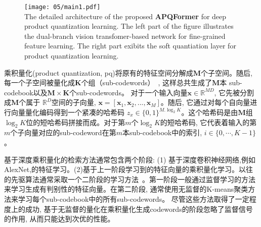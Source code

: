 \begin{figure}[!htp]
  \centering
  \texttt{[image: 05/main1.pdf]} \\
    {The detailed architecture of the proposed \textbf{APQFormer} for deep product quantization learning. The left part of the figure illustrates the dual-branch vision transfomer-based network for fine-grained feature learning. The right part exibits the soft  quantiation layer for product quantization learning. }
 \label{fig:mainapq}
\end{figure} 


乘积量化(product quantization, pq)将原有的特征空间分解成$\mathbf{M}$个子空间。随后, 每一个子空间被量化成$\mathbf{K}$个组（sub-codewords）~\cite{klein2019end}, 这样总共生成了$\mathbf{M}$本 sub-codebook以及$\mathbf{M}\times\mathbf{K}$个sub-codewords。 对于一个输入向量$\mathbf{x} \in  \mathbb{R}^{MD}$, 它先被分割成$\mathbf{M}$个属于 $\mathbb{R}^D$空间的子向量, $ \mathbf{x} =  [\mathbf{x}_1,\mathbf{x}_2,...,\mathbf{x}_M]$。随后, 它通过对每个自向量进行向量量化编码得到一个紧凑的哈希码 $z_x \in \{0,1\}^{M. \log_2{K}}$。这个哈希码是由$\mathbf{M}$组$\log_2{K}$位的短哈希码拼接而成。对于第$m$个$\log_2{K}$的短哈希码, 它代表着输入的第$m$个子向量对应的sub-codeword在第$m$本sub-codebook中的索引,  $i \in \{0,\cdots,K-1\}$。\par
基于深度乘积量化的检索方法通常包含两个阶段: (1) 基于深度卷积神经网络,例如AlexNet,的特征学习。(2)基于上一阶段学习到的特征向量的乘积量化学习。以往的先驱算法通常采取一个二阶段的学习方法~\cite{yue2016deep, liu2018deep, cao2017deep}。第一阶段一般通过监督学习的方法来学习生成有判别性的特征向量。在第二阶段, 通常使用无监督的K-means聚类方法来学习每个sub-codebook中的所有sub-codewords。 尽管这些方法取得了一定程度上的成功, 基于无监督的量化在乘积量化生成codewords的阶段忽略了监督信号的作用, 从而只能达到次优的性能。 \par

